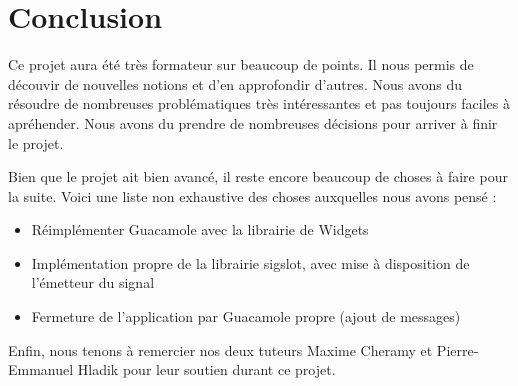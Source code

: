 \section{Conclusion}

Ce projet aura été très formateur sur beaucoup de points.
Il nous permis de découvir de nouvelles notions et d'en approfondir d'autres.
Nous avons du résoudre de nombreuses problématiques très intéressantes et pas toujours faciles à apréhender.
Nous avons du prendre de nombreuses décisions pour arriver à finir le projet.

Bien que le projet ait bien avancé, il reste encore beaucoup de choses à faire pour la suite. Voici une liste non exhaustive des choses auxquelles nous avons pensé :

\begin{itemize}
  \item Réimplémenter Guacamole avec la librairie de Widgets
  \item Implémentation propre de la librairie sigslot, avec mise à disposition de l'émetteur du signal
  \item Fermeture de l'application par Guacamole propre (ajout de messages)
\end{itemize}

Enfin, nous tenons à remercier nos deux tuteurs Maxime Cheramy et Pierre-Emmanuel Hladik pour leur soutien durant ce projet.
